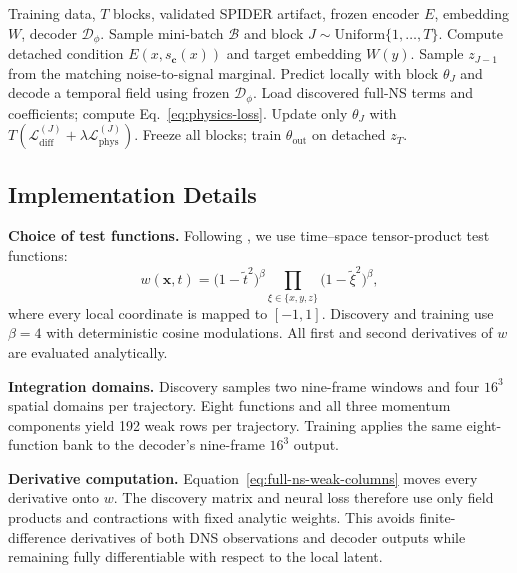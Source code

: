 \documentclass[preprint,12pt]{elsarticle}
\begin{document}
\begin{algorithm}[htbp]
\caption{Strictly local PI-NoProp}
\label{alg:training}
\begin{algorithmic}[1]
\REQUIRE Training data, $T$ blocks, validated SPIDER artifact, frozen encoder $E$, embedding $W$, decoder $\mathcal D_\phi$.
    \STATE Sample mini-batch $\mathcal B$ and block $J\sim\mathrm{Uniform}\{1,\ldots,T\}$.
    \STATE Compute detached condition $E(x,s_{\mathbf c}(x))$ and target embedding $W(y)$.
    \STATE Sample $z_{J-1}$ from the matching noise-to-signal marginal.
    \STATE Predict locally with block $\theta_J$ and decode a temporal field using frozen $\mathcal D_\phi$.
    \STATE Load discovered full-NS terms and coefficients; compute Eq.~\eqref{eq:physics-loss}.
    \STATE Update only $\theta_J$ with $T(\mathcal L_{\mathrm{diff}}^{(J)}+\lambda\mathcal L_{\mathrm{phys}}^{(J)})$.
\ENDFOR
\STATE Freeze all blocks; train $\theta_{\mathrm{out}}$ on detached $z_T$.
\end{algorithmic}
\end{algorithm}

\subsection{Implementation Details}
\label{sec:implementation}

\textbf{Choice of test functions.} Following \cite{gurevich2019robust,gurevich2024learning}, we use time--space tensor-product test functions:
\begin{equation}
\label{eq:test-function}
w(\mathbf{x},t) = \bigl(1-\tilde t^2\bigr)^{\beta}
\prod_{\xi\in\{x,y,z\}} \bigl(1-\tilde{\xi}^2\bigr)^{\beta},
\end{equation}
where every local coordinate is mapped to $[-1,1]$. Discovery and training use
$\beta=4$ with deterministic cosine modulations. All first and second
derivatives of $w$ are evaluated analytically.

\textbf{Integration domains.} Discovery samples two nine-frame windows and
four $16^3$ spatial domains per trajectory. Eight functions and all three
momentum components yield 192 weak rows per trajectory. Training applies the
same eight-function bank to the decoder's nine-frame $16^3$ output.

\textbf{Derivative computation.} Equation~\eqref{eq:full-ns-weak-columns}
moves every derivative onto $w$.  The discovery matrix and neural loss therefore
use only field products and contractions with fixed analytic weights. This
avoids finite-difference derivatives of both DNS observations and decoder
outputs while remaining fully differentiable with respect to the local latent.
\end{document}
